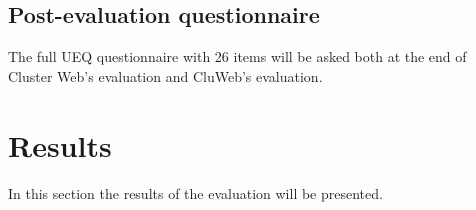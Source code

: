 \subsection{Post-evaluation questionnaire} \label{post-evaluation}
The full UEQ questionnaire with 26 items \cite{laugwitz2008construction} will be asked both at the end of Cluster Web's evaluation and CluWeb's evaluation.

\section{Results}
In this section the results of the evaluation will be presented.


\cite{bevanevaluation, rubin2008handbook, albert2013measuring}